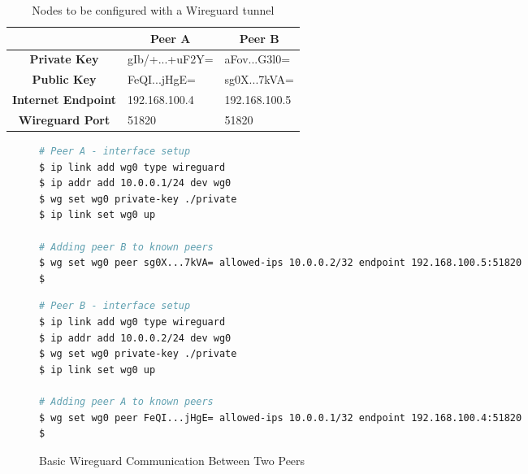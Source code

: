 \documentclass[11pt,twoside,a4paper]{report}
\begin{document}
\begin{table}[]
\centering
\begin{tabular}{c|l|l|}
\cline{2-3}
\multicolumn{1}{l|}{}                            & \multicolumn{1}{c|}{\textbf{Peer A}} & \multicolumn{1}{c|}{\textbf{Peer B}} \\ \hline
\multicolumn{1}{|c|}{\textbf{Private Key}}       & gIb/+...+uF2Y=                       & aFov...G3l0=                         \\ \hline
\multicolumn{1}{|c|}{\textbf{Public Key}}        & FeQI...jHgE=                         & sg0X...7kVA=                         \\ \hline
\multicolumn{1}{|c|}{\textbf{Internet Endpoint}} & 192.168.100.4                        & 192.168.100.5                        \\ \hline
\multicolumn{1}{|c|}{\textbf{Wireguard Port}}    & 51820                                & 51820                                \\ \hline
\end{tabular}
\caption{Nodes to be configured with a Wireguard tunnel}
\label{tab:wgconfpeers}
\end{table}

\begin{figure}
\begin{multicols}{2}
\begin{lstlisting}[language=sh, frame=single, breaklines=true, breakatwhitespace=true, basicstyle=\small]
# Peer A - interface setup
$ ip link add wg0 type wireguard
$ ip addr add 10.0.0.1/24 dev wg0
$ wg set wg0 private-key ./private
$ ip link set wg0 up

# Adding peer B to known peers
$ wg set wg0 peer sg0X...7kVA= allowed-ips 10.0.0.2/32 endpoint 192.168.100.5:51820
$

\end{lstlisting}
\columnbreak
\begin{lstlisting}[language=sh, frame=single, breaklines=true, breakatwhitespace=true, basicstyle=\small]
# Peer B - interface setup
$ ip link add wg0 type wireguard
$ ip addr add 10.0.0.2/24 dev wg0
$ wg set wg0 private-key ./private
$ ip link set wg0 up

# Adding peer A to known peers
$ wg set wg0 peer FeQI...jHgE= allowed-ips 10.0.0.1/32 endpoint 192.168.100.4:51820
$

\end{lstlisting}
\end{multicols}
\caption{Basic Wireguard Communication Between Two Peers}
\label{fig:wgconf}
\end{figure}
\end{document}
